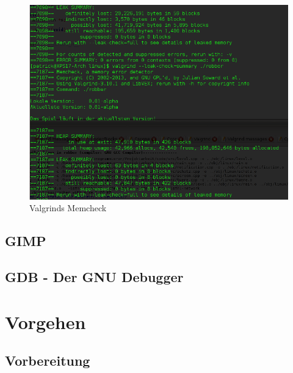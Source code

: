 \documentclass[12pt,a4paper]{scrartcl}
\begin{document}
\begin{figure}
\centering
\includegraphics[scale=0.8]{img/valgrind2.png}
\caption{Valgrinds Memcheck}
\end{figure}


\subsection{GIMP}

\subsection{GDB - Der GNU Debugger}

\newpage
\section{Vorgehen}
\subsection{Vorbereitung}
\end{document}
